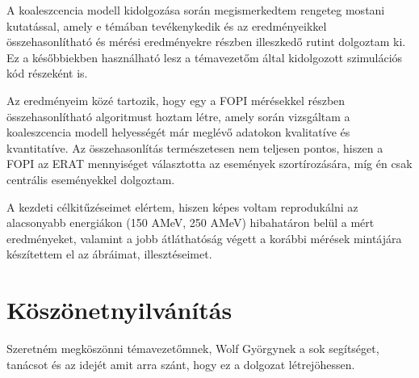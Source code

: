 \documentclass[a4paper,12pt]{article}
\begin{document}
\par A koaleszcencia modell kidolgozása során megismerkedtem rengeteg mostani kutatással, amely e témában tevékenykedik és az eredményeikkel összehasonlítható és mérési eredményekre részben illeszkedő rutint dolgoztam ki. Ez a későbbiekben használható lesz a témavezetőm által kidolgozott szimulációs kód részeként is.
\par Az eredményeim közé tartozik, hogy egy a FOPI mérésekkel részben összehasonlítható algoritmust hoztam létre, amely során vizsgáltam a koaleszcencia modell helyességét már meglévő adatokon kvalitatíve és kvantitatíve. Az összehasonlítás természetesen nem teljesen pontos, hiszen a FOPI az ERAT mennyiséget választotta az események szortírozására, míg én csak centrális eseményekkel dolgoztam.
\par A kezdeti célkitűzéseimet elértem, hiszen képes voltam reprodukálni az alacsonyabb energiákon (150 AMeV, 250 AMeV) hibahatáron belül a mért eredményeket, valamint a jobb átláthatóság végett a korábbi mérések mintájára készítettem el az ábráimat, illesztéseimet.

\section*{ Köszönetnyilvánítás}

\par Szeretném megköszönni témavezetőmnek, Wolf Györgynek a sok segítséget, tanácsot és az idejét amit arra szánt, hogy ez a dolgozat létrejöhessen.

\newpage





\newpage
\end{document}
